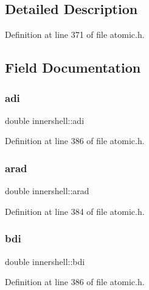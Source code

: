 \subsection{Detailed Description}


Definition at line 371 of file atomic.\+h.



\subsection{Field Documentation}
\mbox{\label{structinnershell_a0fb51c1d8fc61cc8d13f06f7b4a7a5c9}} 
\subsubsection{\texorpdfstring{adi}{adi}}
{\footnotesize\ttfamily double innershell\+::adi}



Definition at line 386 of file atomic.\+h.

\mbox{\label{structinnershell_a1a23a3a1072fe0728beeb00e6cb6af53}} 
\subsubsection{\texorpdfstring{arad}{arad}}
{\footnotesize\ttfamily double innershell\+::arad}



Definition at line 384 of file atomic.\+h.

\mbox{\label{structinnershell_a7242c2f0a726557fc183513409719403}} 
\subsubsection{\texorpdfstring{bdi}{bdi}}
{\footnotesize\ttfamily double innershell\+::bdi}



Definition at line 386 of file atomic.\+h.

\mbox{\label{structinnershell_a3fbae0913c0bfeebe3061f5973959b5e}} 
